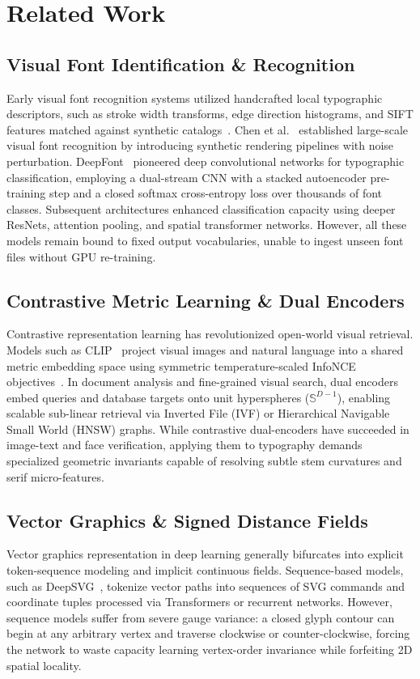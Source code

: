 \documentclass[10pt,twocolumn,letterpaper]{article}
\begin{document}
\section{Related Work}

\subsection{Visual Font Identification \& Recognition}
Early visual font recognition systems utilized handcrafted local typographic descriptors, such as stroke width transforms, edge direction histograms, and SIFT features matched against synthetic catalogs~\cite{chen2014largescale}. Chen et al.~\cite{chen2014largescale} established large-scale visual font recognition by introducing synthetic rendering pipelines with noise perturbation. DeepFont~\cite{Wang2015DeepFont} pioneered deep convolutional networks for typographic classification, employing a dual-stream CNN with a stacked autoencoder pre-training step and a closed softmax cross-entropy loss over thousands of font classes. Subsequent architectures enhanced classification capacity using deeper ResNets, attention pooling, and spatial transformer networks. However, all these models remain bound to fixed output vocabularies, unable to ingest unseen font files without GPU re-training.

\subsection{Contrastive Metric Learning \& Dual Encoders}
Contrastive representation learning has revolutionized open-world visual retrieval. Models such as CLIP~\cite{radford2021learning} project visual images and natural language into a shared metric embedding space using symmetric temperature-scaled InfoNCE objectives~\cite{vandenOord2018RepresentationLW}. In document analysis and fine-grained visual search, dual encoders embed queries and database targets onto unit hyperspheres ($\mathbb{S}^{D-1}$), enabling scalable sub-linear retrieval via Inverted File (IVF) or Hierarchical Navigable Small World (HNSW) graphs. While contrastive dual-encoders have succeeded in image-text and face verification, applying them to typography demands specialized geometric invariants capable of resolving subtle stem curvatures and serif micro-features.

\subsection{Vector Graphics \& Signed Distance Fields}
Vector graphics representation in deep learning generally bifurcates into explicit token-sequence modeling and implicit continuous fields. Sequence-based models, such as DeepSVG~\cite{carlier2020deepsvg}, tokenize vector paths into sequences of SVG commands and coordinate tuples processed via Transformers or recurrent networks. However, sequence models suffer from severe gauge variance: a closed glyph contour can begin at any arbitrary vertex and traverse clockwise or counter-clockwise, forcing the network to waste capacity learning vertex-order invariance while forfeiting 2D spatial locality.
\end{document}
